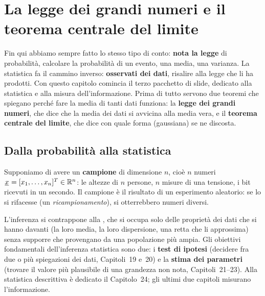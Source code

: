 \chapter{La legge dei grandi numeri e il teorema centrale del limite}

Fin qui abbiamo sempre fatto lo stesso tipo di conto: \textbf{nota la legge} di probabilità, calcolare la probabilità
di un evento, una media, una varianza. La statistica fa il cammino inverso: \textbf{osservati dei dati}, risalire alla
legge che li ha prodotti. Con questo capitolo comincia il terzo pacchetto di slide, dedicato alla statistica e alla
misura dell'informazione. Prima di tutto servono due teoremi che spiegano perché fare la media di tanti dati funziona:
la \textbf{legge dei grandi numeri}, che dice che la media dei dati si avvicina alla media vera, e il \textbf{teorema
centrale del limite}, che dice con quale forma (gaussiana) se ne discosta.

\section{Dalla probabilità alla statistica}

Supponiamo di avere un \textbf{campione} di dimensione $n$, cioè $n$ numeri ${\mkern1mu\underline{x}\mkern1mu} = [x_1, \ldots, x_n]^T \in
\mathbb{R}^n$: le altezze di $n$ persone, $n$ misure di una tensione, i bit ricevuti in un secondo. Il campione è il risultato
di un esperimento aleatorio: se lo si rifacesse (un \emph{ricampionamento}), si otterrebbero numeri diversi.


L'inferenza si contrappone alla , che si occupa solo delle proprietà dei dati che si hanno
davanti (la loro media, la loro dispersione, una retta che li approssima) senza supporre che provengano da una
popolazione più ampia. Gli obiettivi fondamentali dell'inferenza statistica sono due: i \textbf{test di ipotesi}
(decidere fra due o più spiegazioni dei dati, Capitoli~19 e~20) e la \textbf{stima dei parametri} (trovare il valore
più plausibile di una grandezza non nota, Capitoli~21--23). Alla statistica descrittiva è dedicato il Capitolo~24; gli
ultimi due capitoli misurano l'informazione.

